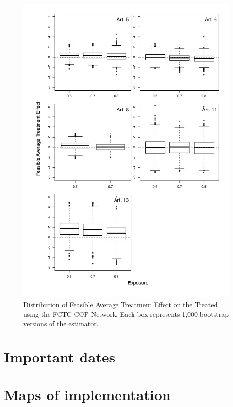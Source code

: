 \documentclass[10pt]{article}
\begin{document}
\begin{figure}[H]
	\centering
	\includegraphics[width=.8\linewidth]{../fig/matching_bloxplot_fctc_cop.pdf}
	\caption{Distribution of Feasible Average Treatment Effect on the Treated using the FCTC COP Network. Each box represents 1,000 bootstrap versions of the estimator.}
\end{figure}

\appendix

\clearpage\section{Important dates}\label{sec:dates}



\section{Maps of implementation}
\end{document}
